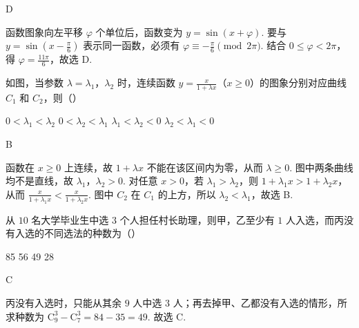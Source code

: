 \begin{answer}
D
\end{answer}

\begin{solution}
函数图象向左平移 \(\varphi\) 个单位后，函数变为 \(y=\sin(x+\varphi)\). 要与 \(y=\sin\left(x-\frac{\pi}{6}\right)\) 表示同一函数，必须有 \(\varphi\equiv-\frac{\pi}{6}\pmod{2\pi}\). 结合 \(0\leqslant\varphi<2\pi\)，得 \(\varphi=\frac{11\pi}{6}\)，故选 D.
\end{solution}

\begin{problem}
如图，当参数 \(\lambda = \lambda_{1}\)，\(\lambda_{2}\) 时，连续函数 \(y = \frac{x}{1 + \lambda x}\)（\(x \geqslant 0\)）的图象分别对应曲线 \(C_{1}\) 和 \(C_{2}\)，则（\quad）


\choices
    {\(0 < \lambda_{1} < \lambda_{2}\)}
    {\(0 < \lambda_{2} < \lambda_{1}\)}
    {\(\lambda_{1} < \lambda_{2} < 0\)}
    {\(\lambda_{2} < \lambda_{1} < 0\)}
\end{problem}

\begin{answer}
B
\end{answer}

\begin{solution}
函数在 \(x\geqslant0\) 上连续，故 \(1+\lambda x\) 不能在该区间内为零，从而 \(\lambda\geqslant0\). 图中两条曲线均不是直线，故 \(\lambda_1\)，\(\lambda_2>0\). 对任意 \(x>0\)，若 \(\lambda_1>\lambda_2\)，则 \(1+\lambda_1x>1+\lambda_2x\)，从而 \(\frac{x}{1+\lambda_1x}<\frac{x}{1+\lambda_2x}\). 图中 \(C_2\) 在 \(C_1\) 的上方，所以 \(\lambda_2<\lambda_1\)，故选 B.
\end{solution}

\begin{problem}
从 \(10\) 名大学毕业生中选 \(3\) 个人担任村长助理，则甲，乙至少有 \(1\) 人入选，而丙没有入选的不同选法的种数为（\quad）

\choices
    {85}
    {56}
    {49}
    {28}
\end{problem}

\begin{answer}
C
\end{answer}

\begin{solution}
丙没有入选时，只能从其余 \(9\) 人中选 \(3\) 人；再去掉甲、乙都没有入选的情形，所求种数为 \(\mathrm C_9^3-\mathrm C_7^3=84-35=49\). 故选 C.
\end{solution}

